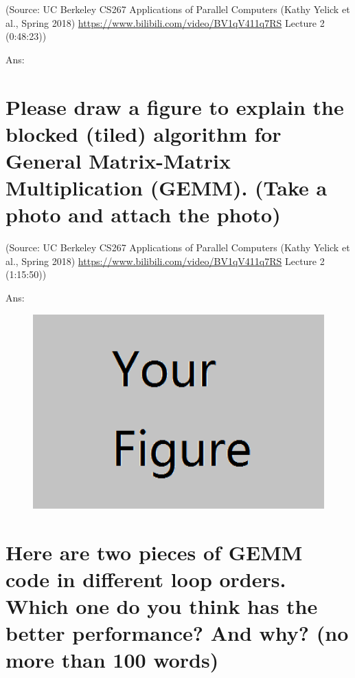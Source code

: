\documentclass{article}
\begin{document}
(Source: UC Berkeley CS267 Applications of Parallel Computers (Kathy Yelick et al., Spring 2018) \url{https://www.bilibili.com/video/BV1qV411q7RS} Lecture 2 (0:48:23))

Ans:%
~\\
\section{Please draw a figure to explain the blocked (tiled) algorithm for General Matrix-Matrix Multiplication (GEMM). (Take a photo and attach the photo)}
(Source: UC Berkeley CS267 Applications of Parallel Computers (Kathy Yelick et al., Spring 2018) \url{https://www.bilibili.com/video/BV1qV411q7RS} Lecture 2 (1:15:50))

Ans:%
\begin{figure}[ht]
\centering
\includegraphics[width=5in]{example.png}
\end{figure}


\section{Here are two pieces of GEMM code in different loop orders. Which one do you think has the better performance? And why? (no more than 100 words)}
\begin{figure}[htbp]
\centering
{}
\end{figure}
\end{document}

